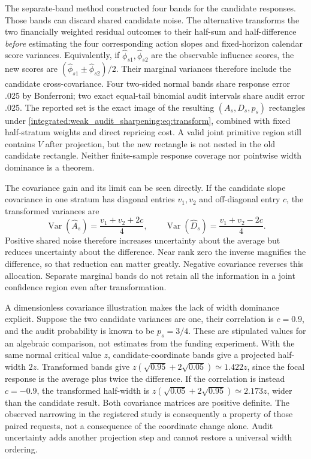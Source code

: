The separate-band method constructed four bands for the candidate
responses. Those bands can discard shared candidate noise. The alternative transforms the two financially weighted residual outcomes to their half-sum
and half-difference \emph{before} estimating the four corresponding action
slopes and fixed-horizon calendar score variances. Equivalently, if
$\widehat\phi_{s1},\widehat\phi_{s2}$ are the observable influence scores,
the new scores are $(\widehat\phi_{s1}\pm\widehat\phi_{s2})/2$. Their marginal
variances therefore include the candidate cross-covariance. Four two-sided
normal bands share response error .025 by Bonferroni; two exact equal-tail
binomial audit intervals share audit error .025. The reported set is the exact
image of the resulting $(A_s,D_s,p_s)$ rectangles under
\eqref{integrated:weak_audit_sharpening:eq:transform}, combined with fixed half-stratum weights and direct
repricing cost. A valid joint primitive region still contains $V$ after
projection, but the new rectangle is not nested in the old candidate
rectangle. Neither finite-sample response coverage nor pointwise width
dominance is a theorem.

The covariance gain and its limit can be seen directly. If the candidate
slope covariance in one stratum has diagonal entries $v_1,v_2$ and
off-diagonal entry $c$, the transformed variances are
\begin{equation}\label{rel80:transformed-covariance}
 \operatorname{Var}(\widehat A_s)=\frac{v_1+v_2+2c}{4},\qquad
 \operatorname{Var}(\widehat D_s)=\frac{v_1+v_2-2c}{4}.
\end{equation}
Positive shared noise therefore increases uncertainty about the average but
reduces uncertainty about the difference. Near rank zero the inverse magnifies
the difference, so that reduction can matter greatly. Negative covariance
reverses this allocation. Separate marginal bands do not retain all the
information in a joint confidence region even after transformation.

A dimensionless covariance illustration makes the lack of width dominance
explicit. Suppose the two candidate variances are one, their correlation is
$c=0.9$, and the audit probability is known to be $p_s=3/4$. These are
stipulated values for an algebraic comparison, not estimates from the funding
experiment. With the same normal critical value $z$, candidate-coordinate
bands give a projected half-width $2z$. Transformed bands give
$z(\sqrt{0.95}+2\sqrt{0.05})\simeq1.422z$, since the focal response is the
average plus twice the difference. If the correlation is instead $c=-0.9$,
the transformed half-width is
$z(\sqrt{0.05}+2\sqrt{0.95})\simeq2.173z$, wider than the candidate result.
Both covariance matrices are positive definite. The observed narrowing in
the registered study is consequently a property of those paired requests,
not a consequence of the coordinate change alone. Audit uncertainty adds
another projection step and cannot restore a universal width ordering.

